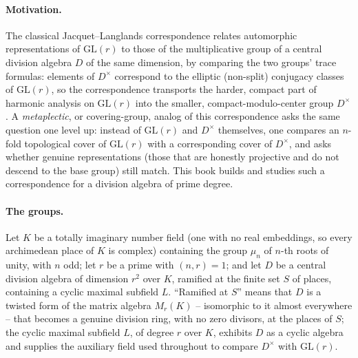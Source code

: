 \documentclass[11pt,oneside]{book}
\theoremstyle{plain}
\theoremstyle{definition}
\begin{document}
\paragraph{Motivation.} The classical Jacquet--Langlands correspondence relates automorphic representations of $\mathrm{GL}(r)$ to those of the multiplicative group of a central division algebra $D$ of the same dimension, by comparing the two groups' trace formulas: elements of $D^\times$ correspond to the elliptic (non-split) conjugacy classes of $\mathrm{GL}(r)$, so the correspondence transports the harder, compact part of harmonic analysis on $\mathrm{GL}(r)$ into the smaller, compact-modulo-center group $D^\times$. A \emph{metaplectic}, or covering-group, analog of this correspondence asks the same question one level up: instead of $\mathrm{GL}(r)$ and $D^\times$ themselves, one compares an $n$-fold topological cover of $\mathrm{GL}(r)$ with a corresponding cover of $D^\times$, and asks whether genuine representations (those that are honestly projective and do not descend to the base group) still match. This book builds and studies such a correspondence for a division algebra of prime degree.

\paragraph{The groups.} Let $K$ be a totally imaginary number field (one with no real embeddings, so every archimedean place of $K$ is complex) containing the group
$\mu_n$ of $n$-th roots of unity, with $n$ odd; let $r$ be a prime with
$(n,r)=1$; and let $D$ be a central division algebra of dimension $r^2$
over $K$, ramified at the finite set $S$ of places, containing a cyclic
maximal subfield $L$. ``Ramified at $S$'' means that $D$ is a twisted form of the matrix algebra $M_r(K)$ -- isomorphic to it almost everywhere -- that becomes a genuine division ring, with no zero divisors, at the places of $S$; the cyclic maximal subfield $L$, of degree $r$ over $K$, exhibits $D$ as a cyclic algebra and supplies the auxiliary field used throughout to compare $D^\times$ with $\mathrm{GL}(r)$.
\end{document}
